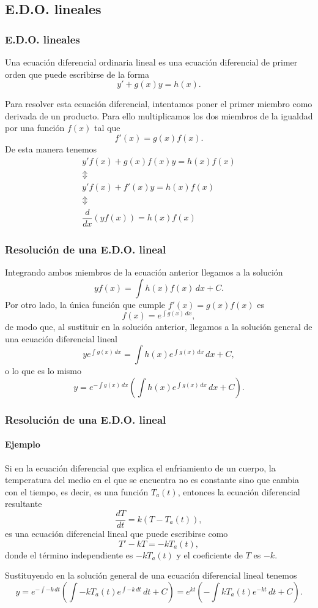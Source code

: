 \subsection{E.D.O. lineales}
\begin{frame}
\frametitle{E.D.O. lineales}
\begin{definicion}[E.D.O. lineal]
Una ecuación diferencial ordinaria lineal es una ecuación diferencial de primer orden que puede escribirse de la forma
\[y'+g(x)y = h(x).\]
\end{definicion}

Para resolver esta ecuación diferencial, intentamos poner el primer miembro como derivada de un producto. Para ello multiplicamos los dos miembros de la igualdad por una función $f(x)$ tal que 
\[f'(x)=g(x)f(x).\]
De esta manera tenemos
\[
\begin{array}{c}
y'f(x)+g(x)f(x)y=h(x)f(x)\\
\Updownarrow\\
y'f(x)+f'(x)y=h(x)f(x)\\
\Updownarrow\\
\dfrac{d}{dx}(yf(x))=h(x)f(x)
\end{array}
\]
\end{frame}


\begin{frame}
\frametitle{Resolución de una E.D.O. lineal}
Integrando ambos miembros de la ecuación anterior llegamos a la solución
\[
yf(x)=\int h(x)f(x)\,dx+C.
\]
Por otro lado, la única función que cumple $f'(x)=g(x)f(x)$ es
\[
f(x)=e^{\int g(x)\,dx},
\]
de modo que, al sustituir en la solución anterior, llegamos a la solución general de una ecuación diferencial lineal
\[
ye^{\int g(x)\,dx}=\int h(x) e^{\int g(x)\,dx}\,dx+C,
\]
o lo que es lo mismo
\[
y=e^{-\int g(x)\,dx}\left(\int h(x)e^{\int g(x)\,dx}\,dx+C\right).
\]
\end{frame}


\begin{frame}
\frametitle{Resolución de una E.D.O. lineal}
\framesubtitle{Ejemplo}
Si en la ecuación diferencial que explica el enfriamiento de un cuerpo, la temperatura del medio en el que se encuentra no es constante sino que cambia con el tiempo, es decir, es una función $T_a(t)$, entonces la ecuación diferencial resultante 
\[
\frac{dT}{dt}=k(T-T_a(t)),
\]
es una ecuación diferencial lineal que puede escribirse como
\[
T'-kT=-kT_a(t),
\]
donde el término independiente es $-kT_a(t)$ y el coeficiente de $T$ es $-k$.

Sustituyendo en la solución general de una ecuación diferencial lineal tenemos
\[
y=e^{-\int -k\,dt}\left(\int -kT_a(t)e^{\int -k\,dt}\,dt+C\right)=
e^{kt}\left(-\int kT_a(t)e^{-kt}\,dt+C\right).
\]
\end{frame}


